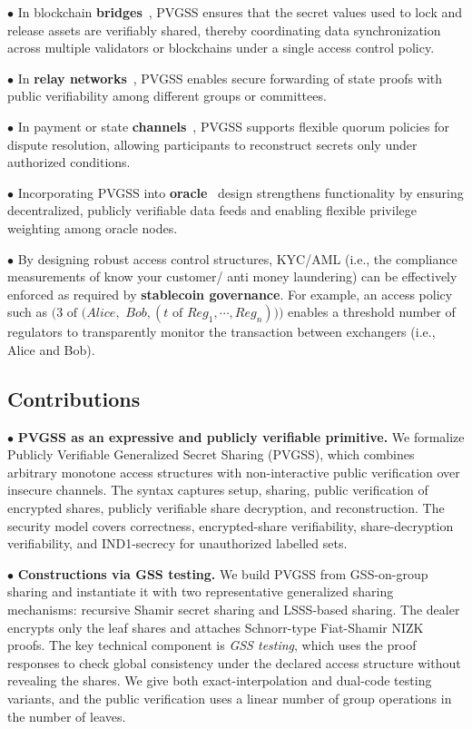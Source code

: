 \documentclass[runningheads]{llncs}
\begin{document}
$\bullet$ In blockchain \textbf{bridges}~\cite{Xie2022zkBridge}, PVGSS ensures that the secret values used to lock and release assets are verifiably shared, thereby coordinating data synchronization across multiple validators or blockchains under a single access control policy.

$\bullet$ In \textbf{relay networks}~\cite{Li2022Bridge}, PVGSS enables secure forwarding of state proofs with public verifiability among different groups or committees.

$\bullet$ In payment or state \textbf{channels}~\cite{Dziembowski2018Channel}, PVGSS supports flexible quorum policies for dispute resolution, allowing participants to reconstruct secrets only under authorized conditions.

$\bullet$ Incorporating PVGSS into \textbf{oracle}~\cite{Park2023Oracle} design strengthens functionality by ensuring decentralized, publicly verifiable data feeds and enabling flexible privilege weighting among oracle nodes.

$\bullet$ By designing robust access control structures, KYC/AML (i.e., the compliance measurements of know your customer/ anti money laundering) can be effectively enforced as required by \textbf{stablecoin governance}. For example, an access policy such as  \((3 \text{ of } (Alice,\) \(Bob, (t \text{ of } Reg_1,\cdots, Reg_n)))\) enables a threshold number of regulators to transparently monitor the transaction between exchangers (i.e., Alice and Bob).




\subsection{Contributions}

$\bullet$ \textbf{PVGSS as an expressive and publicly verifiable primitive.}
We formalize Publicly Verifiable Generalized Secret Sharing (PVGSS), which combines arbitrary monotone access structures with non-interactive public verification over insecure channels. The syntax captures setup, sharing, public verification of encrypted shares, publicly verifiable share decryption, and reconstruction. The security model covers correctness, encrypted-share verifiability, share-decryption verifiability, and IND1-secrecy for unauthorized labelled sets.

$\bullet$ \textbf{Constructions via GSS testing.}
We build PVGSS from GSS-on-group sharing and instantiate it with two representative generalized sharing mechanisms: recursive Shamir secret sharing and LSSS-based sharing. The dealer encrypts only the leaf shares and attaches Schnorr-type Fiat-Shamir NIZK proofs. The key technical component is \emph{GSS testing}, which uses the proof responses to check global consistency under the declared access structure without revealing the shares. We give both exact-interpolation and dual-code testing variants, and the public verification uses a linear number of group operations in the number of leaves.
\end{document}
